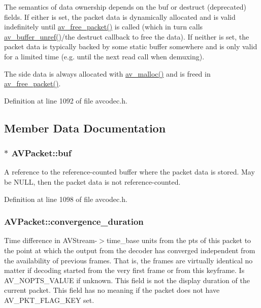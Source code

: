 The semantics of data ownership depends on the buf or destruct (deprecated) fields. If either is set, the packet data is dynamically allocated and is valid indefinitely until \hyperlink{group__lavc__packet_gae65881462e78f98b268f34661d921ee0}{av\+\_\+free\+\_\+packet()} is called (which in turn calls \hyperlink{group__lavu__buffer_ga135e9e929b5033bb8f68322497b2effc}{av\+\_\+buffer\+\_\+unref()}/the destruct callback to free the data). If neither is set, the packet data is typically backed by some static buffer somewhere and is only valid for a limited time (e.\+g. until the next read call when demuxing).

The side data is always allocated with \hyperlink{group__lavu__mem_gacbca30ebc510a7e4156d66e7aceb2dc8}{av\+\_\+malloc()} and is freed in \hyperlink{group__lavc__packet_gae65881462e78f98b268f34661d921ee0}{av\+\_\+free\+\_\+packet()}. 

Definition at line 1092 of file avcodec.\+h.



\subsection{Member Data Documentation}
\subsubsection[{\texorpdfstring{buf}{buf}}]{$\ast$ A\+V\+Packet\+::buf}\hypertarget{struct_a_v_packet_a3bf81872813551fe9343dd0e09993e38}{}\label{struct_a_v_packet_a3bf81872813551fe9343dd0e09993e38}
A reference to the reference-\/counted buffer where the packet data is stored. May be N\+U\+LL, then the packet data is not reference-\/counted. 

Definition at line 1098 of file avcodec.\+h.

\subsubsection[{\texorpdfstring{convergence\+\_\+duration}{convergence_duration}}]{ A\+V\+Packet\+::convergence\+\_\+duration}\hypertarget{struct_a_v_packet_a942409654446e8da1834c17ce69d0ce9}{}\label{struct_a_v_packet_a942409654446e8da1834c17ce69d0ce9}
Time difference in A\+V\+Stream-\/$>$time\+\_\+base units from the pts of this packet to the point at which the output from the decoder has converged independent from the availability of previous frames. That is, the frames are virtually identical no matter if decoding started from the very first frame or from this keyframe. Is A\+V\+\_\+\+N\+O\+P\+T\+S\+\_\+\+V\+A\+L\+UE if unknown. This field is not the display duration of the current packet. This field has no meaning if the packet does not have A\+V\+\_\+\+P\+K\+T\+\_\+\+F\+L\+A\+G\+\_\+\+K\+EY set.

